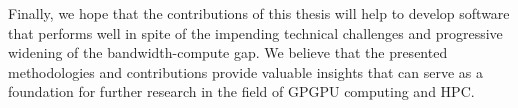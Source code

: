 Finally, we hope that the contributions of this thesis will help to develop software that performs well in spite of the impending technical challenges and progressive widening of the bandwidth-compute gap. We believe that the presented methodologies and contributions provide valuable insights that can serve as a foundation for further research in the field of GPGPU computing and HPC.
